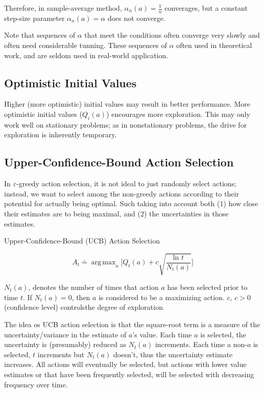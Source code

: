 \documentclass[lang=en,mode=geye,device=normal,color=blue,14pt]{elegantnote}
\DeclareMathOperator*{\1}{\mathbbm{1}}
\DeclareMathOperator*{\argmax}{arg\,max}
\begin{document}
Therefore, in sample-average method, $\alpha_n(a) = \frac{1}{n}$ converages, but a constant step-size parameter $\alpha_n(a)=\alpha$ does not converge.

Note that sequences of $\alpha$ that meet the conditions often converge very slowly and often need considerable tunning.
These sequences of $\alpha$ often used in theoretical work, and are seldom used in real-world application.

\subsection{Optimistic Initial Values}

Higher (more optimistic) initial values may result in better performance. More optimistic initial values ($Q_i(a)$) encourages more exploration.
This may only work well on stationary problems; as in nonstationary problems, the drive for exploration is inherently temporary.

\subsection{Upper-Confidence-Bound Action Selection}

In $\varepsilon$-greedy action selection, it is not ideal to just randomly select actions; instead, we want to select among the non-greedy actions according to their potential for actually being optimal. Such taking into account both (1) how close their estimates are to being maximal, and (2) the uncertainties in those estimates.

\begin{definition}
Upper-Confidence-Bound (UCB) Action Selection

\[
A_t \doteq \argmax_a \bigg[ Q_t(a) + c\sqrt{\frac{\text{ln }t}{N_t(a)}} \bigg]
\]
\end{definition}
$N_t(a)$, denotes the number of times that action $a$ has been selected prior to time $t$. If $N_t(a)=0$, then $a$ is considered to be a maximizing action.
$c$, $c > 0$ (confidence level) controlsthe degree of exploration

The idea os UCB action selection is that the square-root term is a measure of the uncertainty/variance in the estimate of $a$'s value.
Each time $a$ is selected, the uncertainty is (presumably) reduced as $N_t(a)$ increments.
Each time a non-$a$ is selected, $t$ increments but $N_t(a)$ doesn't, thus the uncertainty estimate increases.
All actions will eventually be selected, but actions with lower value estimates or that have been frequently selected, will be selected with decreasing frequency over time.
\end{document}

